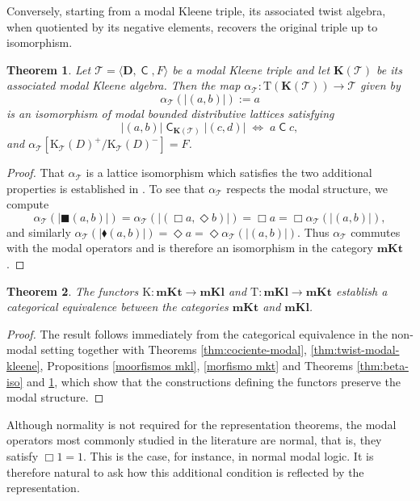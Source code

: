 \documentclass[10pt,a4paper]{amsart}
\newtheorem{theorem}{Theorem}[section]
\DeclareMathOperator{\con}{\mathsf{C}}
\newcommand{\KC}[1]{\mathrm{K}_\T(#1)}
\newcommand{\D}{\mathbf{D}}
\newcommand{\T}{\mathcal{T}}
\newcommand{\boxn}{\blacksquare}
\newcommand{\diamon}{\blacklozenge}
\begin{document}
Conversely, starting from a modal Kleene triple, its associated twist algebra, when quotiented by its negative elements, recovers the original triple up to isomorphism.

\begin{theorem}
\label{thm:alpha-iso}
    Let $\T=\langle\D, \con, F\rangle$ be a modal Kleene triple and let $\mathbf{K}(\T)$ be its associated modal Kleene algebra. Then the map $\alpha_\T \colon \mathrm{T}(\mathbf{K}(\T))\to \T$ given by
    \[
        \alpha_\T(|(a,b)|) := a
    \]
    is an isomorphism of modal bounded distributive lattices satisfying
    \[
        |(a,b)|\con_{\mathbf{K}(\T)} |(c,d)| \;\Longleftrightarrow\; a\con c,
    \]
    and $\alpha_\T[\KC{D}^+/\KC{D}^-]=F$.
\end{theorem}
\begin{proof}
    That $\alpha_\T$ is a lattice isomorphism which satisfies the two additional properties is established in \cite{jalali}.  To see that $\alpha_\T$ respects the modal structure, we compute
    \[
        \alpha_\T(|\boxn (a, b)|) = \alpha_\T(| (\Box a, \Diamond b)|) = \Box a = \Box \alpha_\T(|(a,b)|),
    \]
    and similarly $\alpha_\T(|\diamon (a,b)|) = \Diamond a = \Diamond \alpha_\T(|(a,b)|)$. Thus $\alpha_\T$ commutes with the modal operators and is therefore an isomorphism in the category $\mathbf{mKt}$.
\end{proof}

\begin{theorem}\label{teorema equivalencia}
The functors $\mathrm{K}:\mathbf{mKt}\to\mathbf{mKl}$ and $\mathrm{T}:\mathbf{mKl}\to\mathbf{mKt}$
establish a categorical equivalence between the categories $\mathbf{mKt}$ and $\mathbf{mKl}$.
\end{theorem}
\begin{proof}
The result follows immediately from the categorical equivalence in the non-modal setting together with Theorems \ref{thm:cociente-modal}, \ref{thm:twist-modal-kleene}, Propositions \ref{moorfismos mkl}, \ref{morfismo mkt} and Theorems \ref{thm:beta-iso} and \ref{thm:alpha-iso}, which show that the constructions defining the functors preserve the modal structure.
\end{proof}

Although normality is not required for the representation theorems, the modal operators most commonly studied in the literature are normal, that is, they satisfy $\Box 1=1$. This is the case, for instance, in normal modal logic. It is therefore natural to ask how this additional condition is reflected by the representation.
\end{document}
